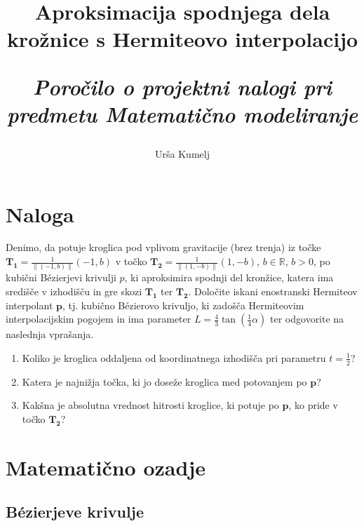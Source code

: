\documentclass[a4paper,12pt]{article}
\title{\textbf{\huge Aproksimacija spodnjega dela krožnice s Hermiteovo interpolacijo}
	
	\Large \it Poročilo o projektni nalogi pri predmetu Matematično modeliranje}
\author{Urša Kumelj}
\begin{document}
	
	\maketitle
	
	\tableofcontents

	\newpage

	\section{Naloga}
	Denimo, da potuje kroglica pod vplivom gravitacije (brez trenja) iz točke $\boldsymbol{T_1} = \frac{1}{\| (-1,b) \|} (-1,b)$ v točko $\boldsymbol{T_2} = \frac{1}{\|(1,-b)\|}(1,-b)$, $b \in \mathbb{R}$, $b>0$, po
	kubični B\'{e}zierjevi krivulji $p$, ki aproksimira spodnji del kronžice, katera
	ima središče v izhodišču in gre skozi $\boldsymbol{T_1}$ ter $\boldsymbol{T_2}$. Določite iskani enostranski Hermiteov interpolant $\boldsymbol{p}$, tj. kubično B\'{e}zierovo krivuljo, ki zadošča Hermiteovim interpolacijskim pogojem in ima parameter 
	$L = \frac{4}{3} \tan(\frac{1}{4}\alpha)$ ter odgovorite na naslednja vprašanja.
	\begin{enumerate}[label=(\alph*)]
		\item Koliko je kroglica oddaljena od koordinatnega izhodišča pri parametru $t = \frac{1}{2}$?
		\item Katera je najnižja točka, ki jo doseže kroglica med potovanjem po $\boldsymbol{p}$?
		\item Kakšna je absolutna vrednost hitrosti kroglice, ki potuje po $\boldsymbol{p}$, ko
		pride v točko $\boldsymbol{T_2}$?

	\end{enumerate}

	
	\section{Matematično ozadje}
	
	\subsection{B\'{e}zierjeve krivulje}
	
\end{document}
